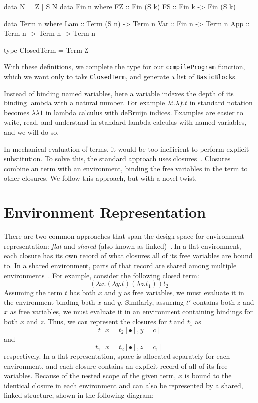 \documentclass[preprint]{sigplanconf}
\begin{document}
\begin{code}
data N = Z | S N
data Fin n where
  FZ :: Fin (S k)
  FS :: Fin k -> Fin (S k)

data Term n where
  Lam :: Term (S n) -> Term n
  Var :: Fin n -> Term n 
  App :: Term n -> Term n -> Term n

type ClosedTerm = Term Z
\end{code}

With these definitions, we complete the type for our \texttt{compileProgram}
function, which we want only to take \texttt{ClosedTerm}, and generate a list
of \texttt{BasicBlock}s.

Instead of binding named variables, here a variable indexes the depth of its
binding lambda with a natural number. For example $\lambda t.\lambda f.t$ in
standard notation becomes $\lambda\lambda1$ in lambda calculus with deBruijn
indices.  Examples are easier to write, read, and understand in standard lambda
calculus with named variables, and we will do so.

In mechanical evaluation of terms, it would be too inefficient to perform
explicit substitution. To solve this, the standard approach uses
closures~\cite{landin1964mechanical, curien1991abstract, jonesstg,
biernacka2007concrete}. Closures combine an term with an environment, binding
the free variables in the term to other closures. We follow this
approach, but with a novel twist. 

\section{Environment Representation} \label{sec:env}

There are two common approaches that span the design space for environment
representation: \emph{flat} and \emph{shared} (also
known as linked)~\cite{appel1988optimizing, shao1994space}. In a flat
environment, each closure has its own record of what closures all
of its free variables are bound to. In a shared environment, parts
of that record are shared among multiple environments~\cite{appel1988optimizing,
shao1994space}. For example, consider the following closed term: $$(\lambda
x.(\lambda y.t) (\lambda z.t_1)) t_2$$ Assuming the term $t$ has both $x$ and
$y$ as free variables, we must evaluate it in the environment binding both $x$
and $y$.  Similarly, assuming $t'$ contains both $z$ and $x$ as free variables,
we must evaluate it in an environment containing bindings for both $x$ and $z$.
Thus, we can represent the closures for $t$ and $t_1$ as $$t[x=t_2[\bullet],
y=c]$$ and $$t_1[x=t_2[\bullet], z=c_1]$$ respectively. In a flat
representation, space is allocated separately for each environment, and each
closure contains an explicit record of all of its free variables. Because of the
nested scope of the given term, $x$ is bound to the identical closure in each
environment and can also be represented by a shared, linked structure, shown in
the following diagram:
\end{document}
